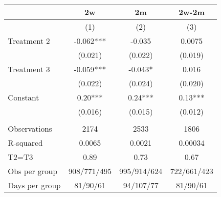 \begin{tabular}{lccc}
\toprule
      & 2w    & 2m    & 2w-2m \\
\midrule
      & (1)   & (2)   & (3) \\
\midrule
\midrule
Treatment 2 & -0.062*** & -0.035 & 0.0075 \\
      & (0.021) & (0.022) & (0.019) \\
Treatment 3 & -0.059*** & -0.043* & 0.016 \\
      & (0.022) & (0.024) & (0.020) \\
Constant  & 0.20*** & 0.24*** & 0.13*** \\
      & (0.016) & (0.015) & (0.012) \\
      &       &       &  \\
\midrule
Observations & 2174  & 2533  & 1806 \\
R-squared & 0.0065 & 0.0021 & 0.00034 \\
T2=T3 & 0.89  & 0.73  & 0.67 \\
Obs per group & 908/771/495 & 995/914/624 & 722/661/423 \\
Days per group & 81/90/61 & 94/107/77 & 81/90/61 \\
\bottomrule
\bottomrule
\end{tabular}%
